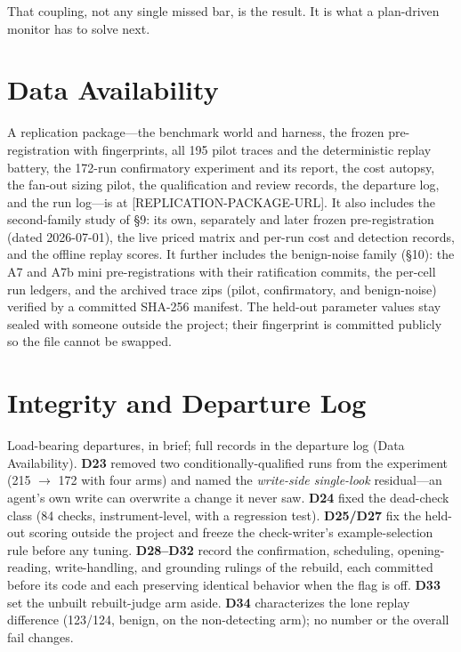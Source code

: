 \documentclass[acmsmall,screen]{acmart}
\begin{document}
That coupling, not any single missed bar, is the result. It is what a
plan-driven monitor has to solve next.

\section*{Data Availability}
A replication package---the benchmark world and harness, the frozen
pre-registration with fingerprints, all 195 pilot traces and the deterministic
replay battery, the 172-run confirmatory experiment and its report, the cost
autopsy, the fan-out sizing pilot, the qualification and review records, the
departure log, and the run log---is at [REPLICATION-PACKAGE-URL]. It also includes
the second-family study of \S9: its own, separately and later frozen
pre-registration (dated 2026-07-01), the live priced matrix and per-run cost and
detection records, and the offline replay scores. It further includes the
benign-noise family (\S10): the A7 and A7b mini pre-registrations with their
ratification commits, the per-cell run ledgers, and the archived trace zips
(pilot, confirmatory, and benign-noise) verified by a committed SHA-256 manifest.
The held-out parameter values
stay sealed with someone outside the project; their fingerprint is committed
publicly so the file cannot be swapped.

\appendix

\section{Integrity and Departure Log}
Load-bearing departures, in brief; full records in the departure log (Data
Availability). \textbf{D23} removed two conditionally-qualified runs from the
experiment (215 $\rightarrow$ 172 with four arms) and named the \emph{write-side
single-look} residual---an agent's own write can overwrite a change it never
saw. \textbf{D24} fixed the dead-check class (84 checks, instrument-level, with a
regression test). \textbf{D25/D27} fix the held-out scoring outside the project
and freeze the check-writer's example-selection rule before any tuning.
\textbf{D28--D32} record the confirmation, scheduling, opening-reading,
write-handling, and grounding rulings of the rebuild, each committed before its
code and each preserving identical behavior when the flag is off. \textbf{D33}
set the unbuilt rebuilt-judge arm aside. \textbf{D34} characterizes the lone
replay difference (123/124, benign, on the non-detecting arm); no number or the
overall fail changes.
\end{document}
